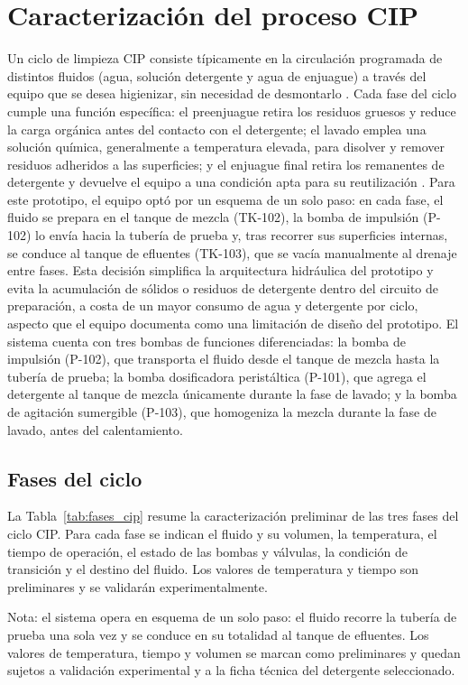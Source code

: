\section{Caracterización del proceso CIP}\label{sec:caracterizacion}
{Un ciclo de limpieza CIP consiste típicamente en la circulación programada de distintos fluidos (agua, solución detergente y agua de enjuague) a través del equipo que se desea higienizar, sin necesidad de desmontarlo \cite{bowser2023cip,johansson2025cip}. Cada fase del ciclo cumple una función específica: el preenjuague retira los residuos gruesos y reduce la carga orgánica antes del contacto con el detergente; el lavado emplea una solución química, generalmente a temperatura elevada, para disolver y remover residuos adheridos a las superficies; y el enjuague final retira los remanentes de detergente y devuelve el equipo a una condición apta para su reutilización \cite{johansson2025cip}. Para este prototipo, el equipo optó por un esquema de un solo paso: en cada fase, el fluido se prepara en el tanque de mezcla (TK-102), la bomba de impulsión (P-102) lo envía hacia la tubería de prueba y, tras recorrer sus superficies internas, se conduce al tanque de efluentes (TK-103), que se vacía manualmente al drenaje entre fases. Esta decisión simplifica la arquitectura hidráulica del prototipo y evita la acumulación de sólidos o residuos de detergente dentro del circuito de preparación, a costa de un mayor consumo de agua y detergente por ciclo, aspecto que el equipo documenta como una limitación de diseño del prototipo. El sistema cuenta con tres bombas de funciones diferenciadas: la bomba de impulsión (P-102), que transporta el fluido desde el tanque de mezcla hasta la tubería de prueba; la bomba dosificadora peristáltica (P-101), que agrega el detergente al tanque de mezcla únicamente durante la fase de lavado; y la bomba de agitación sumergible (P-103), que homogeniza la mezcla durante la fase de lavado, antes del calentamiento.}
\subsection{Fases del ciclo}
La Tabla~\ref{tab:fases_cip} resume la caracterización preliminar de las tres fases del ciclo CIP. Para cada fase se indican el fluido y su volumen, la temperatura, el tiempo de operación, el estado de las bombas y válvulas, la condición de transición y el destino del fluido. Los valores de temperatura y tiempo son preliminares y se validarán experimentalmente.

{Nota: el sistema opera en esquema de un solo paso: el fluido recorre la tubería de prueba una sola vez y se conduce en su totalidad al tanque de efluentes. Los valores de temperatura, tiempo y volumen se marcan como preliminares y quedan sujetos a validación experimental y a la ficha técnica del detergente seleccionado.}

